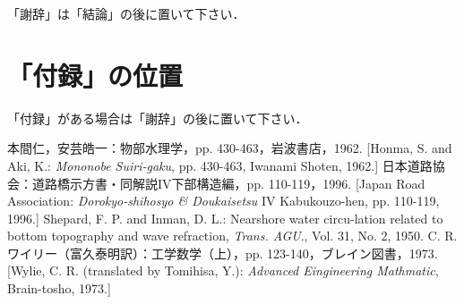 \documentclass{jjsce}
\begin{document}
\Acknowledgment %
「謝辞」は「結論」の後に置いて下さい．

\appendix
\section*{「付録」の位置}
「付録」がある場合は「謝辞」の後に置いて下さい．

\begin{thebibliography}{9}
本間仁，安芸皓一：物部水理学，pp. 430-463，岩波書店，1962. [Honma, S. and Aki, K.: \textit{Mononobe Suiri-gaku}, pp. 430-463, Iwanami Shoten, 1962.]
日本道路協会：道路橋示方書・同解説IV下部構造編，pp. 110-119，1996. [Japan Road Association: \textit{Dorokyo-shihosyo \& Doukaisetsu} IV Kabukouzo-hen, pp. 110-119, 1996.]
Shepard, F. P. and Inman, D. L.: Nearshore water circu-lation related to bottom topography and wave refraction, \textit{Trans. AGU}., Vol. 31, No. 2, 1950.
C. R. ワイリー（富久泰明訳）：工学数学（上），pp. 123-140，ブレイン図書，1973. [Wylie, C. R. (translated by Tomihisa, Y.): \textit{Advanced Eingineering Mathmatic}, Brain-tosho, 1973.]
\end{thebibliography}
\end{document}

